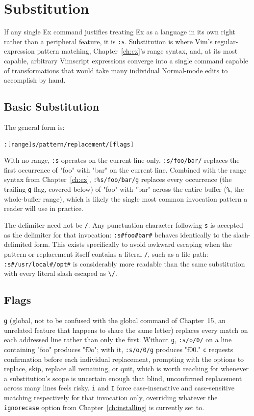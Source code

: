 \chapter{Substitution}
\label{ch:substitution}

If any single Ex command justifies treating Ex as a language in its own right rather than a peripheral feature, it is \texttt{:s}. Substitution is where Vim's regular-expression pattern matching, Chapter~\ref{ch:ex}'s range syntax, and, at its most capable, arbitrary Vimscript expressions converge into a single command capable of transformations that would take many individual Normal-mode edits to accomplish by hand.

\section{Basic Substitution}

The general form is:

\begin{center}
\texttt{:[range]s/pattern/replacement/[flags]}
\end{center}

With no range, \texttt{:s} operates on the current line only. \texttt{:s/foo/bar/} replaces the first occurrence of "foo" with "bar" on the current line. Combined with the range syntax from Chapter~\ref{ch:ex}, \texttt{:\%s/foo/bar/g} replaces every occurrence (the trailing \texttt{g} flag, covered below) of "foo" with "bar" across the entire buffer (\texttt{\%}, the whole-buffer range), which is likely the single most common invocation pattern a reader will use in practice.

The delimiter need not be \texttt{/}. Any punctuation character following \texttt{s} is accepted as the delimiter for that invocation: \texttt{:s\#foo\#bar\#} behaves identically to the slash-delimited form. This exists specifically to avoid awkward escaping when the pattern or replacement itself contains a literal \texttt{/}, such as a file path: \texttt{:s\#/usr/local\#/opt\#} is considerably more readable than the same substitution with every literal slash escaped as \texttt{\textbackslash/}.

\section{Flags}

\texttt{g} (global, not to be confused with the global command of Chapter~15, an unrelated feature that happens to share the same letter) replaces every match on each addressed line rather than only the first. Without \texttt{g}, \texttt{:s/o/0/} on a line containing "foo" produces "f0o"; with it, \texttt{:s/o/0/g} produces "f00." \texttt{c} requests confirmation before each individual replacement, prompting with the options to replace, skip, replace all remaining, or quit, which is worth reaching for whenever a substitution's scope is uncertain enough that blind, unconfirmed replacement across many lines feels risky. \texttt{i} and \texttt{I} force case-insensitive and case-sensitive matching respectively for that invocation only, overriding whatever the \texttt{ignorecase} option from Chapter~\ref{ch:installing} is currently set to.


